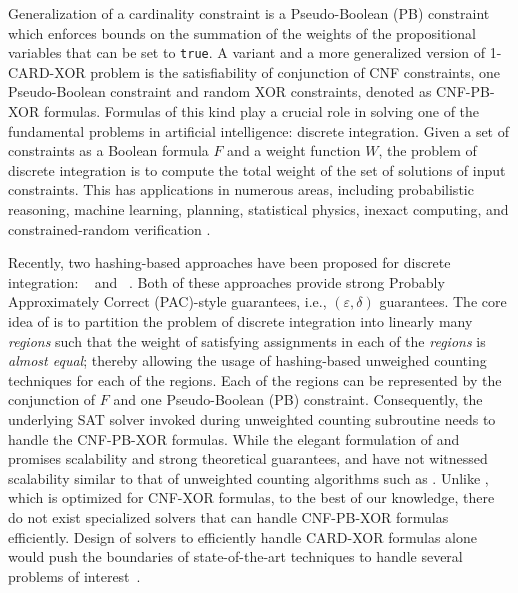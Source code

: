 
Generalization of a cardinality constraint is a Pseudo-Boolean (PB) constraint which enforces bounds on the summation of the weights of the propositional variables that can be set to {\tt true}.
A variant and a more generalized version of 1-CARD-XOR problem is the satisfiability of conjunction of CNF constraints, one Pseudo-Boolean constraint and random XOR constraints, denoted as CNF-PB-XOR 
formulas. Formulas of this kind play a crucial role in solving one of the fundamental problems in artificial intelligence: discrete integration.
  Given a set of constraints as a Boolean formula $F$ and a weight function $W$, the problem of discrete integration is to compute the total weight of the set of solutions of input constraints. This has applications in 
numerous areas, including probabilistic reasoning, machine learning, 
planning, statistical physics, inexact computing, and 
constrained-random verification
\cite{JS96,MP99,Bacchus2003,Sang04combiningcomponent,DH07,GSS08,Mur12,EGSS14a}.

Recently, two hashing-based approaches have been proposed for discrete integration: {\WISH}~\cite{EGSS13c} and {\WeightMC}~\cite{CFMSV14}.  Both of these approaches provide strong Probably Approximately Correct (PAC)-style guarantees, i.e., $(\varepsilon,\delta)$ guarantees. The core idea of {\WeightMC} is to partition the problem of discrete integration into linearly many {\em regions} such that the weight of satisfying assignments in each of the {\em regions} is {\em almost equal}; thereby allowing the usage of hashing-based unweighed counting techniques for each of the regions. Each of the regions can be represented by the conjunction of $F$ and one Pseudo-Boolean (PB) constraint. Consequently, the underlying SAT solver invoked during unweighted counting subroutine needs to handle the CNF-PB-XOR formulas.
 While the elegant formulation of {\WISH} and {\WeightMC} promises scalability and strong theoretical guarantees, {\WISH} and {\WeightMC} have not witnessed scalability similar to that of unweighted counting algorithms such as {\ApproxMCThree}. Unlike {\CryptoMiniSAT}, which is optimized for CNF-XOR formulas, to the best of our knowledge, there do not exist specialized solvers that can handle CNF-PB-XOR formulas efficiently. Design of solvers to efficiently  handle CARD-XOR formulas alone would push the boundaries of state-of-the-art techniques to handle several problems of interest~\cite{Par18}. 
 

